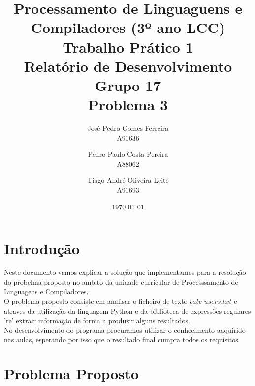 \documentclass[11pt,a4paper]{report}%
\title{Processamento de Linguaguens e Compiladores (3º ano LCC)\\
       \textbf{Trabalho Prático 1}\\ Relatório de Desenvolvimento \\ \textbf{Grupo 17}\\ Problema 3
       } %
\author{José Pedro Gomes Ferreira\\ A91636 \and Pedro Paulo Costa Pereira\\ A88062
         \and Tiago André Oliveira Leite\\ A91693
       } %
\date{\today} %
\begin{document}
\maketitle %


\tableofcontents %




\chapter{Introdução} \label{chap:intro} %

Neste documento vamos explicar a solução que implementamos para a resolução do probelma proposto no ambito da unidade curricular de Processsamento de Linguagens e Compiladores. \\
O problema proposto consiste em analisar o ficheiro de texto $calv$-$users.txt$ e atraves da utilização da linguagem Python e da biblioteca de expressões regulares 're' extrair informação de forma a produzir alguns resultados.\\No desenvolvimento do programa procuramos utilizar o conhecimento adquirido nas aulas, esperando por isso que o resultado final cumpra todos os requisitos. 





\chapter{Problema Proposto} \label{chap:ProbelemaProposto} %
\end{document}
